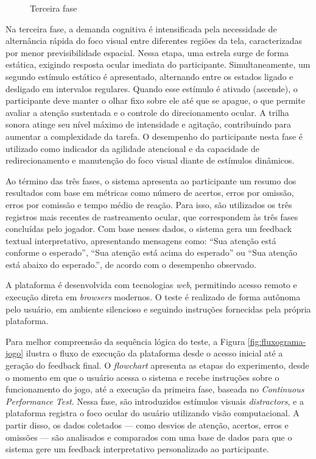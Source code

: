 \begin{figure}[H]
    \centering
    \caption{Terceira fase}%
    \label{fig:terceira-fase}
\end{figure}

Na terceira fase, a demanda cognitiva é intensificada pela necessidade de alternância rápida do foco visual entre diferentes regiões da tela, caracterizadas por menor previsibilidade espacial. Nessa etapa, uma estrela surge de forma estática, exigindo resposta ocular imediata do participante. Simultaneamente, um segundo estímulo estático é apresentado, alternando entre os estados ligado e desligado em intervalos regulares. Quando esse estímulo é ativado (ascende), o participante deve manter o olhar fixo sobre ele até que se apague, o que permite avaliar a atenção sustentada e o controle do direcionamento ocular. A trilha sonora atinge seu nível máximo de intensidade e agitação, contribuindo para aumentar a complexidade da tarefa. O desempenho do participante nesta fase é utilizado como indicador da agilidade atencional e da capacidade de redirecionamento e manutenção do foco visual diante de estímulos dinâmicos.

Ao término das três fases, o sistema apresenta ao participante um resumo dos resultados com base em métricas como número de acertos, erros por omissão, erros por comissão e tempo médio de reação. Para isso, são utilizados os três registros mais recentes de rastreamento ocular, que correspondem às três fases concluídas pelo jogador. Com base nesses dados, o sistema gera um feedback textual interpretativo, apresentando mensagens como: “Sua atenção está conforme o esperado”, “Sua atenção está acima do esperado” ou “Sua atenção está abaixo do esperado.”, de acordo com o desempenho observado.

A plataforma é desenvolvida com tecnologias \textit{web}, permitindo acesso remoto e execução
direta em \textit{browsers} modernos. O teste é realizado de forma autônoma pelo usuário, em ambiente silencioso e seguindo instruções fornecidas pela própria plataforma.

Para melhor compreensão da sequência lógica do teste, a Figura \ref{fig:fluxograma-jogo} ilustra o fluxo de execução da plataforma desde o acesso inicial até a geração do feedback final. O \textit{flowchart} apresenta as etapas do experimento, desde o momento em que o usuário acessa o sistema e recebe instruções sobre o funcionamento do jogo, até a execução da primeira fase, baseada no \textit{Continuous Performance Test}. Nessa fase, são introduzidos estímulos visuais \textit{distractors}, e a plataforma registra o foco ocular do usuário utilizando visão computacional. A partir disso, os dados coletados — como desvios de atenção, acertos, erros e omissões — são analisados e comparados com uma base de dados para que o sistema gere um feedback interpretativo personalizado ao participante.


